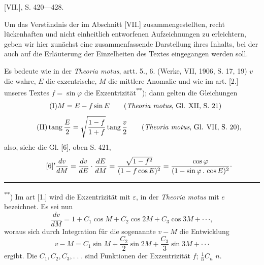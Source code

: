 \par\bigskip\begingroup\small
\makeatletter\tagsleft@true\let\veqno\@@leqno\makeatother
\begin{center} [VII.], S. 420—428.\end{center}
\indent Um das Verständnis der im Abschnitt [VII.] zusammengestellten, recht lückenhaften und nicht einheitlich entworfenen Aufzeichnungen zu erleichtern, geben wir hier zunächst eine zusammenfassende Darstellung ihres Inhalts, bei der auch auf die Erläuterung der Einzelheiten des Textes eingegangen werden soll.

\indent Es bedeute wie in der \textit{Theoria motus}, artt. 5., 6. (Werke, VII, 1906, S. 17, 19) \(v\) die wahre, \(E\) die exzentrische, \(M\) die mittlere Anomalie und wie im art. [2.] unseres Textes \(f=\sin\varphi\) die Exzentrizität\textsuperscript{**}); dann gelten die Gleichungen
\begin{equation}\tag*{(I)}
\begin{aligned}M&=E-f\sin E\qquad (\text{\textit{Theoria motus}, Gl. XII, S. 21})\end{aligned}
\end{equation}
\begin{equation}\tag*{(II)}
\operatorname{tang}\frac E2=\sqrt{\frac{1-f}{1+f}}\operatorname{tang}\frac v2
\qquad (\text{\textit{Theoria motus}, Gl. VII, S. 20}),
\end{equation}
\noindent also, siehe die Gl. [6], oben S. 421,
\begin{equation}\tag*{[6]$'$}
\frac{dv}{dM}=\frac{dv}{dE}\cdot\frac{dE}{dM}
=\frac{\sqrt{1-f^2}}{(1-f\cos E)^2}
=\frac{\cos\varphi}{(1-\sin\varphi\,{.}\,\cos E)^2}\mathpunct{\raisebox{.5ex}{.}}
\end{equation}
\par\medskip\noindent\rule{.24\linewidth}{.4pt}\par\smallskip
\noindent\hspace*{\parindent}\textsuperscript{**}) Im art [1.] wird die Exzentrizität mit \(\varepsilon\), in der \textit{Theoria motus} mit \(e\) bezeichnet.
\clearpage{}
\indent Es sei nun
\begin{equation}\tag*{(III)}
\frac{dv}{dM}=1+C_1\cos M+C_2\cos2M+C_3\cos3M+\cdotp\cdotp\cdotp,
\end{equation}
\noindent woraus sich durch Integration für die sogenannte  \(v-M\) die Entwicklung
\begin{equation}\tag*{(IV)}
v-M=C_1\sin M+\frac{C_2}{2}\sin2M+\frac{C_3}{3}\sin3M+\cdotp\cdotp\cdotp
\end{equation}
\noindent ergibt. Die \(C_1,C_2,C_3,{.}\;{.}\;{.}\) sind Funktionen der Exzentrizität \(f\);  \(\frac1n C_n\)  \(n\).

